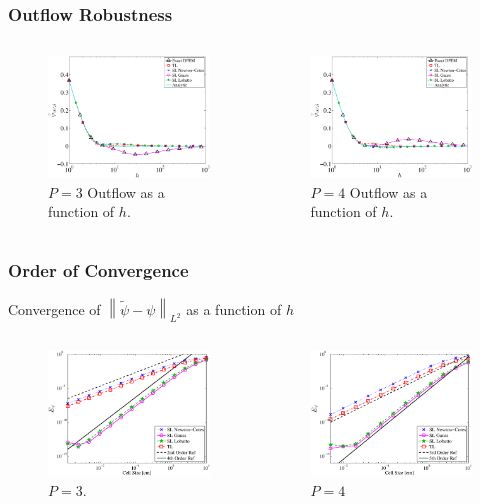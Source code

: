 \documentclass{beamer}
\newcommand{\norm}[1]{\ensuremath{\left\lVert #1 \right\rVert}}  %
\begin{document}
\begin{frame}
\frametitle{Outflow Robustness}
\begin{columns}[c]
\begin{figure}
\includegraphics[width=5.5cm]{P3_Outflow_AllMeth.eps}
\caption{$P=3$ Outflow as a function of $h$.}
\end{figure}
\begin{figure}
\includegraphics[width=5.5cm]{P4_Outflow_AllMeth.eps}
\caption{$P=4$ Outflow as a function of $h$.}
\end{figure}
\end{columns}
\end{frame}

\begin{frame}
\frametitle{Order of Convergence}
Convergence of $\norm{ \widetilde{\psi} - \psi }_{L^2}$ as a function of $h$ 
\begin{columns}[c]
\begin{figure}
\includegraphics[width=5.5cm]{Cubic_L2_err.eps}
\caption{$P=3$.}
\end{figure}
\begin{figure}
\includegraphics[width=5.5cm]{Quartic_L2_err.eps}
\caption{$P=4$}
\end{figure}
\end{columns}
\end{frame}
\end{document}
